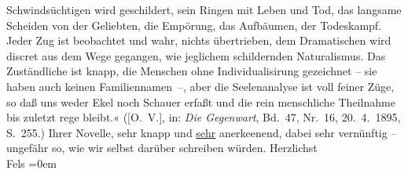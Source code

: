 \begin{ledgroupsized}[t]{13cm}
{{{                            Schwindsüchtigen wird geschildert, sein Ringen mit Leben und Tod, das
                            langsame Scheiden von der Geliebten, die Empörung, das Aufbäumen, der
                            Todeskampf. Jeder Zug ist beobachtet und wahr, nichts übertrieben, dem
                            Dramatischen wird discret aus dem Wege gegangen, wie jeglichem
                            schildernden Naturalismus. Das Zuständliche ist knapp, die Menschen ohne
                            Individualisirung gezeichnet – sie haben auch keinen Familiennamen –,
                            aber die Seelenanalyse ist voll feiner Züge, so daß uns weder Ekel noch
                            Schauer erfaßt und die rein menschliche Theilnahme bis zuletzt rege
                            bleibt.« ([O. V.], in: \emph{Die
                                Gegenwart}, Bd. 47, Nr. 16, 20. 4. 1895,
                            S. 255.)}}}\label{K_L00430_1h} Ihrer Novelle, sehr knapp und \uline{sehr} anerke{\geminationn}enend, dabei sehr vernünftig
                    – ungefähr so, wie wir selbst darüber schreiben würden.\pend
           \pstart
           Herzlichst{\\[\baselineskip]}\spacefill\mbox{Fels}\pend
           \leftskip=0em{}\endnumbering{}\end{ledgroupsized}  \newcommand{\dateiname}{L00430}\newcommand{\titel}{Friedrich M. Fels an Arthur Schnitzler, 23. 4. 1895}\newcommand{\editorInnen}{Martin Anton Müller und Gerd-Hermann Susen}
      